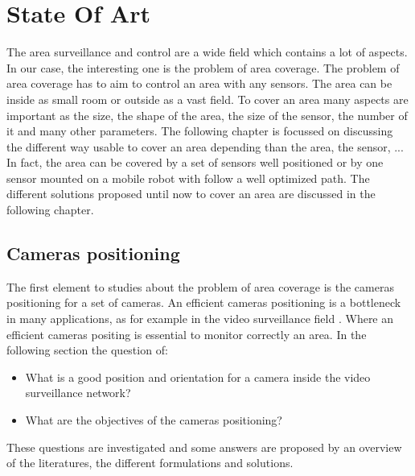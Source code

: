 \chapter{State Of Art}\label{chap:stateOfTheArt}

\minitoc

The area surveillance and control are a wide field which contains a lot of aspects. In our case, the interesting one is the problem of area coverage. 
The problem of area coverage has to aim to control an area with any sensors. The area can be inside as small room or outside as a vast field. To cover an area many aspects are important as the size, the shape of the area, the size of the sensor, the number of it and many other parameters. The following chapter is focussed on discussing the different way usable to cover an area depending than the area, the sensor, ... In fact, the area can be covered by a set of sensors well positioned or by one sensor mounted on a mobile robot with follow a well optimized path.
 The different solutions proposed until now to cover an area are discussed in the following chapter.


\section{Cameras positioning }\label{sec:camerasPositioning}

The first element to studies about the problem of area coverage is the cameras positioning for a set of cameras.
An efficient cameras positioning is a bottleneck in many applications, as for example in the video surveillance field \cite{11*herrera2012,12*soto2009,18*ding2012,151*zhao2013,84*xu2011}. Where an efficient cameras positing is essential to monitor correctly an area.  
In the following section the question of: 
\begin{itemize}
\item[ ] What is a good position and orientation for a camera inside the video surveillance network?
\item[ ]What are the objectives of the cameras positioning?

\end{itemize}
These questions are investigated and some answers are proposed by an overview of the literatures, the different formulations and solutions. 


